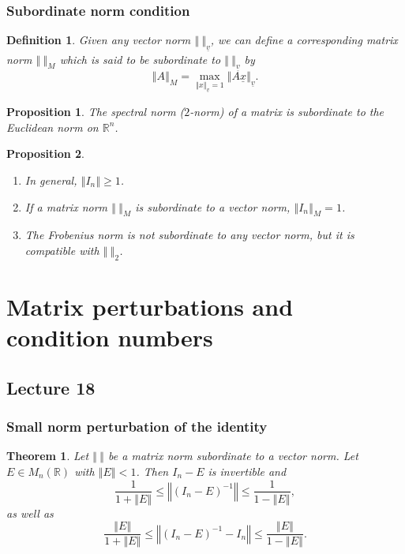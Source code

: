 \documentclass{article}
\newtheorem{theorem}{Theorem}
\newtheorem{definition}{Definition}
\newtheorem{proposition}{Proposition}
\begin{document}
\subsubsection{Subordinate norm condition}
\begin{definition}
    Given any vector norm $\left\Vert \ \right\Vert_{\underline{v}}$, we can define a corresponding matrix norm $\left\Vert \ \right\Vert_M$ which is said to be subordinate to $\left\Vert \ \right\Vert_{\underline{v}}$ by
    \begin{equation}
        \left\Vert A \right\Vert_M = \max_{\left\Vert x \right\Vert_{\underline{v}}=1}\left\Vert A\underline{x} \right\Vert_{\underline{v}}.
    \end{equation}
\end{definition}
\begin{proposition}
    The spectral norm ($2$-norm) of a matrix is subordinate to the Euclidean norm on $\mathbb{R}^n$.
\end{proposition}
\begin{proposition}
    \begin{enumerate}
        \item In general, $\left\Vert I_n \right\Vert\geq 1$.
        \item If a matrix norm $\left\Vert \ \right\Vert_M$ is subordinate to a vector norm, $\left\Vert I_n \right\Vert_M=1$.
        \item The Frobenius norm is not subordinate to any vector norm, but it is compatible with $\left\Vert \ \right\Vert_2$.
    \end{enumerate}
\end{proposition}

\section{Matrix perturbations and condition numbers}
\subsection{Lecture 18}
\subsubsection{Small norm perturbation of the identity}
\begin{theorem}
    Let $\left\Vert \ \right\Vert$ be a matrix norm subordinate to a vector norm. Let $E\in M_n(\mathbb{R})$ with $\left\Vert E \right\Vert<1$. Then $I_n-E$ is invertible and
    \begin{equation}
        \frac{1}{1+\left\Vert E \right\Vert}\leq\left\Vert (I_n-E)^{-1} \right\Vert\leq \frac{1}{1-\left\Vert E \right\Vert},
    \end{equation}
    as well as
    \begin{equation}
        \frac{\left\Vert E \right\Vert}{1+\left\Vert E \right\Vert}\leq\left\Vert (I_n-E)^{-1}-I_n \right\Vert\leq \frac{\left\Vert E \right\Vert}{1-\left\Vert E \right\Vert}.
    \end{equation}
\end{theorem}
\end{document}
